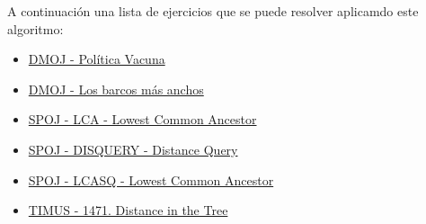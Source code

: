 A continuación una lista de ejercicios que se puede resolver aplicamdo este algoritmo:

\begin{itemize}
	\item \href{https://dmoj.uclv.edu.cu/problem/cowpol}{DMOJ - Política Vacuna}
	\item \href{https://dmoj.uclv.edu.cu/problem/barcos}{DMOJ - Los barcos más anchos}
	\item \href{https://www.spoj.com/problems/LCA/}{SPOJ - LCA - Lowest Common Ancestor}
	\item \href{https://www.spoj.com/problems/DISQUERY/}{SPOJ - DISQUERY - Distance Query}
	\item \href{https://www.spoj.com/problems/LCASQ/}{SPOJ - LCASQ - Lowest Common Ancestor}
	\item \href{https://acm.timus.ru/problem.aspx?space=1&num=1471}{TIMUS - 1471. Distance in the Tree}
\end{itemize}